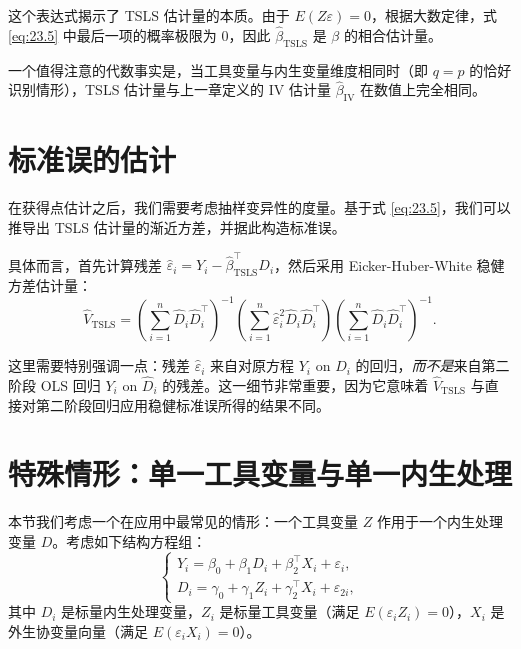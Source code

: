 这个表达式揭示了 TSLS 估计量的本质。由于 $E(Z\varepsilon)=0$，根据大数定律，式 \cref{eq:23.5} 中最后一项的概率极限为 0，因此 $\hat{\beta}_{\mathrm{TSLS}}$ 是 $\beta$ 的相合估计量。

一个值得注意的代数事实是，当工具变量与内生变量维度相同时（即 $q=p$ 的恰好识别情形），TSLS 估计量与上一章定义的 IV 估计量 $\hat{\beta}_{\mathrm{IV}}$ 在数值上完全相同。

\section{标准误的估计}\label{sec:TSLS-standard-error}

在获得点估计之后，我们需要考虑抽样变异性的度量。基于式 \cref{eq:23.5}，我们可以推导出 TSLS 估计量的渐近方差，并据此构造标准误。

具体而言，首先计算残差 $\hat{\varepsilon}_i = Y_i - \hat{\beta}_{\mathrm{TSLS}}^{\top}D_i$，然后采用 Eicker-Huber-White 稳健方差估计量：
\begin{equation}
\hat{V}_{\mathrm{TSLS}} = \left(\sum_{i=1}^{n}\hat{D}_i\hat{D}_i^{\top}\right)^{-1}\left(\sum_{i=1}^{n}\hat{\varepsilon}_i^{2}\hat{D}_i\hat{D}_i^{\top}\right)\left(\sum_{i=1}^{n}\hat{D}_i\hat{D}_i^{\top}\right)^{-1}. \label{eq:23.6}
\end{equation}

这里需要特别强调一点：残差 $\hat{\varepsilon}_i$ 来自对原方程 $Y_i$ on $D_i$ 的回归，\emph{而不是}来自第二阶段 OLS 回归 $Y_i$ on $\hat{D}_i$ 的残差。这一细节非常重要，因为它意味着 $\hat{V}_{\mathrm{TSLS}}$ 与直接对第二阶段回归应用稳健标准误所得的结果不同。

\section{特殊情形：单一工具变量与单一内生处理}\label{sec:single-IV-single-treatment}

本节我们考虑一个在应用中最常见的情形：一个工具变量 $Z$ 作用于一个内生处理变量 $D$。考虑如下结构方程组：
\begin{equation}
\begin{cases}
Y_i = \beta_0 + \beta_1 D_i + \beta_2^{\top}X_i + \varepsilon_i, \\
D_i = \gamma_0 + \gamma_1 Z_i + \gamma_2^{\top}X_i + \varepsilon_{2i},
\end{cases} \label{eq:23.7}
\end{equation}
其中 $D_i$ 是标量内生处理变量，$Z_i$ 是标量工具变量（满足 $E(\varepsilon_iZ_i)=0$），$X_i$ 是外生协变量向量（满足 $E(\varepsilon_iX_i)=0$）。

